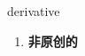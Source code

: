 
\begin{frame}
{\huge derivative}
\begin{center}
\begin{enumerate}\Large
  \item \textbf{非原创的}
\end{enumerate}
\end{center}
\end{frame}
